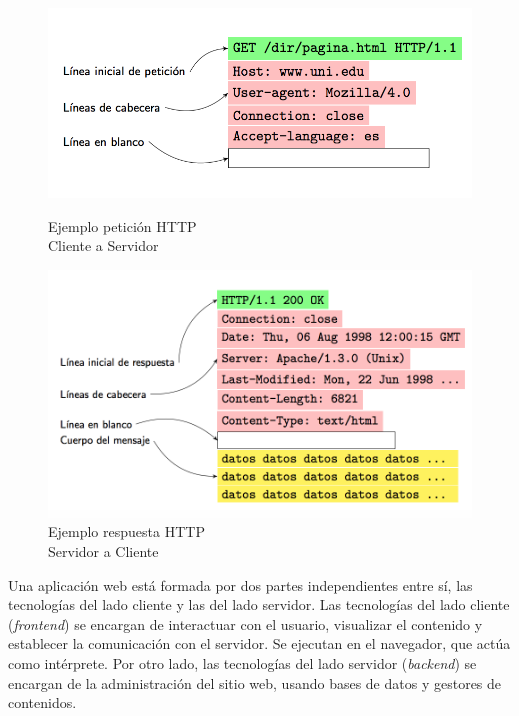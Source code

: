 \begin{figure}[H]
\centering
\begin{minipage}[t]{.45\linewidth}
\centering
\includegraphics[width=1\columnwidth]{chapters/images/peticionhttp.png}
\caption{Ejemplo petición HTTP\\ Cliente a Servidor}
\end{minipage}
\hspace{0.25in}
\begin{minipage}[t]{.45\linewidth}
\centering
\includegraphics[width=1\columnwidth]{chapters/images/respuestahttp.png}
\caption{Ejemplo respuesta HTTP\\ Servidor a Cliente}
\end{minipage}
\end{figure}


Una aplicación web está formada por dos partes independientes entre sí,  las tecnologías del lado cliente y las del lado servidor. Las tecnologías del lado cliente (\textit{frontend}) se encargan de  interactuar con el usuario, visualizar el contenido y establecer la comunicación con el servidor. Se ejecutan en el navegador, que actúa como intérprete. Por otro lado, las tecnologías del lado servidor (\textit{backend}) se encargan de la administración del sitio web, usando bases de datos y gestores de contenidos.

